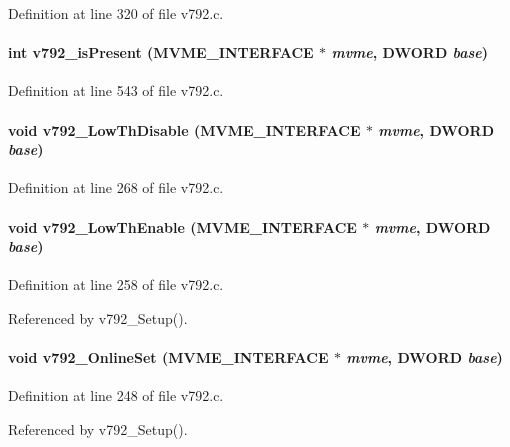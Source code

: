Definition at line 320 of file v792.c.
\paragraph[{v792\_\-isPresent}]{\setlength{\rightskip}{0pt plus 5cm}int v792\_\-isPresent ({\bf MVME\_\-INTERFACE} $\ast$ {\em mvme}, \/  {\bf DWORD} {\em base})}\hfill\label{v792_8h_aa0adfeaa5eca01071ebb851f38cc335c}


Definition at line 543 of file v792.c.
\paragraph[{v792\_\-LowThDisable}]{\setlength{\rightskip}{0pt plus 5cm}void v792\_\-LowThDisable ({\bf MVME\_\-INTERFACE} $\ast$ {\em mvme}, \/  {\bf DWORD} {\em base})}\hfill\label{v792_8h_a69f05689b417afaa147650ccbd16c2cf}


Definition at line 268 of file v792.c.
\paragraph[{v792\_\-LowThEnable}]{\setlength{\rightskip}{0pt plus 5cm}void v792\_\-LowThEnable ({\bf MVME\_\-INTERFACE} $\ast$ {\em mvme}, \/  {\bf DWORD} {\em base})}\hfill\label{v792_8h_a18d55eb7a70830ed3486ca903cea172a}


Definition at line 258 of file v792.c.

Referenced by v792\_\-Setup().
\paragraph[{v792\_\-OnlineSet}]{\setlength{\rightskip}{0pt plus 5cm}void v792\_\-OnlineSet ({\bf MVME\_\-INTERFACE} $\ast$ {\em mvme}, \/  {\bf DWORD} {\em base})}\hfill\label{v792_8h_a2b31dff81eccb0fd5342891f39b6919a}


Definition at line 248 of file v792.c.

Referenced by v792\_\-Setup().
